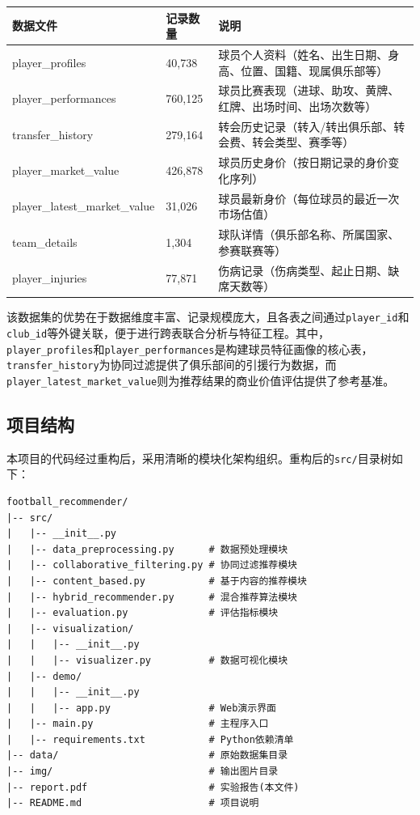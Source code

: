 \documentclass[a4paper]{article}
\begin{document}
\begin{tcolorbox}[enhanced, colback=blue!3!white, colframe=NavyBlue!60!black,
  title=\textbf{表1：Transfermarkt 数据集文件概览}, fonttitle=\bfseries,
  arc=4mm, boxrule=1pt, drop fuzzy shadow=blue!20]
\begin{table}[H]
\centering
\label{tab:dataset}
\begin{tabular}{@{}llp{8cm}@{}}
\toprule
\textbf{数据文件} & \textbf{记录数量} & \textbf{说明} \\
\midrule
player\_profiles          & 40,738   & 球员个人资料（姓名、出生日期、身高、位置、国籍、现属俱乐部等） \\
player\_performances      & 760,125  & 球员比赛表现（进球、助攻、黄牌、红牌、出场时间、出场次数等） \\
transfer\_history         & 279,164  & 转会历史记录（转入/转出俱乐部、转会费、转会类型、赛季等） \\
player\_market\_value      & 426,878  & 球员历史身价（按日期记录的身价变化序列） \\
player\_latest\_market\_value & 31,026 & 球员最新身价（每位球员的最近一次市场估值） \\
team\_details             & 1,304    & 球队详情（俱乐部名称、所属国家、参赛联赛等） \\
player\_injuries          & 77,871   & 伤病记录（伤病类型、起止日期、缺席天数等） \\
\bottomrule
\end{tabular}
\end{table}
\end{tcolorbox}

该数据集的优势在于数据维度丰富、记录规模庞大，且各表之间通过\texttt{player\_id}和\texttt{club\_id}等外键关联，便于进行跨表联合分析与特征工程。其中，\texttt{player\_profiles}和\texttt{player\_performances}是构建球员特征画像的核心表，\texttt{transfer\_history}为协同过滤提供了俱乐部间的引援行为数据，而\texttt{player\_latest\_market\_value}则为推荐结果的商业价值评估提供了参考基准。

\subsection{项目结构}

本项目的代码经过重构后，采用清晰的模块化架构组织。重构后的\texttt{src/}目录树如下：

\begin{verbatim}
football_recommender/
|-- src/
|   |-- __init__.py
|   |-- data_preprocessing.py      # 数据预处理模块
|   |-- collaborative_filtering.py # 协同过滤推荐模块
|   |-- content_based.py           # 基于内容的推荐模块
|   |-- hybrid_recommender.py      # 混合推荐算法模块
|   |-- evaluation.py              # 评估指标模块
|   |-- visualization/
|   |   |-- __init__.py
|   |   |-- visualizer.py          # 数据可视化模块
|   |-- demo/
|   |   |-- __init__.py
|   |   |-- app.py                 # Web演示界面
|   |-- main.py                    # 主程序入口
|   |-- requirements.txt           # Python依赖清单
|-- data/                          # 原始数据集目录
|-- img/                           # 输出图片目录
|-- report.pdf                     # 实验报告(本文件)
|-- README.md                      # 项目说明
\end{verbatim}
\end{document}
